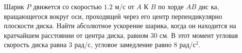 Шарик $P$ движется со скоростью $1.2$ м/с от $A$ К $B$ по хорде $AB$ дис
ка, вращающегося вокруг оси, проходящей через его центр перпендикулярно
плоскости диска. Найти абсолютное ускорение шарика, когда он находится 
на кратчайшем расстоянии от центра диска, равном $30$ см. В этот момент
угловая скорость диска равна $3$ рад/с, угловое замедление равно $8$ 
рад/с$^2$.
